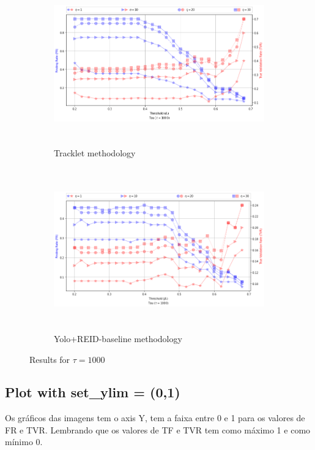 \documentclass{article}
\begin{document}
\begin{figure}[H]
    \begin{subfigure}{0.9\textwidth}
        \includegraphics[width=12cm, height=7cm]{images_results/tracklet_tau1000.png} 
        \caption{Tracklet methodology}
        \label{fig:subim1}
    \end{subfigure}
    
    \begin{subfigure}{0.9\textwidth}
        \includegraphics[width=12cm, height=7cm]{images_results/yolo_tau1000.png}
        \caption{Yolo+REID-baseline methodology}
        \label{fig:subim2}
    \end{subfigure}

\caption{Results for $\tau = 1000$}
\label{fig:tracklet_tau1000}
\end{figure}




\newpage
\newpage
\newpage


\subsection{Plot with \textbf{set\_ylim} = (0,1)  }  
Os gráficos das imagens tem o axis Y, tem a faixa  entre 0 e 1 para os valores de FR e TVR. Lembrando que os valores de TF e TVR tem como máximo 1 e como mínimo 0.
\end{document}
